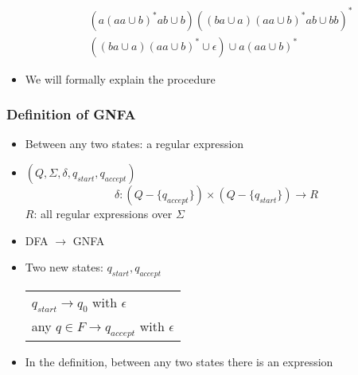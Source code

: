 \begin{frame}[allowframebreaks]
\begin{itemize}
\begin{center}
\end{center}
\begin{equation*}
  \begin{split}
& (a(aa\cup b)^* ab \cup b)
((ba \cup a)(aa \cup b)^* ab \cup bb)^*
\\
&((ba \cup a)
    (aa\cup b)^* \cup \epsilon) \cup a(aa \cup b)^*
  \end{split}
\end{equation*}
\item We will formally explain the procedure
\end{itemize}
\end{frame}

\begin{frame}[allowframebreaks] \frametitle{Definition of GNFA}
  \begin{itemize}
\item Between any two states: a regular expression
\item $(Q, \Sigma, \delta, q_{start}, q_{accept})$
  \begin{equation*}
    \delta:(Q-\{q_{accept}\})\times
(Q-\{q_{start}\})\rightarrow R
  \end{equation*}
$R$: all regular expressions over $\Sigma$



\item DFA $\rightarrow $ GNFA

\item [] Two new states: $q_{start}, q_{accept}$

  \begin{center}
    \begin{tabular}{l}
$q_{start} \rightarrow q_0$ with $\epsilon$ \\
any $q \in F \rightarrow q_{accept}$ with $\epsilon$
    \end{tabular}
\end{center}
\item In the definition, between any two states there is
  an expression


\end{itemize}
\end{frame}
